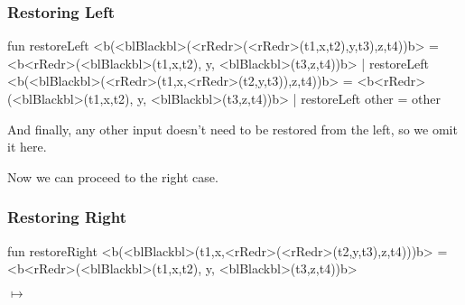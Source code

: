 \documentclass[aspectratio=169]{beamer}
\begin{document}
\begin{frame}[fragile]
  \frametitle{Restoring Left}

  \begin{codeblock}
    fun restoreLeft <b(<blBlackbl>(<rRedr>(<rRedr>(t1,x,t2),y,t3),z,t4))b> =
          <b<rRedr>(<blBlackbl>(t1,x,t2), y, <blBlackbl>(t3,z,t4))b>
      | restoreLeft <b(<blBlackbl>(<rRedr>(t1,x,<rRedr>(t2,y,t3)),z,t4))b> =
          <b<rRedr>(<blBlackbl>(t1,x,t2), y, <blBlackbl>(t3,z,t4))b>
      | restoreLeft other = other
  \end{codeblock}

  \pause
  \vspace{\fill}

  And finally, any other input doesn't need to be restored from the left,
  so we omit it here.

  \vspace{\fill}

  Now we can proceed to the right case.
\end{frame}

\begin{frame}[fragile]
  \frametitle{Restoring Right}

  \begin{codeblock}
    fun restoreRight <b(<blBlackbl>(t1,x,<rRedr>(<rRedr>(t2,y,t3),z,t4)))b> =
          <b<rRedr>(<blBlackbl>(t1,x,t2), y, <blBlackbl>(t3,z,t4))b>
  \end{codeblock}

  \pause
  \begin{center}
    \begin{minipage}{0.35\textwidth}
      \centering
    \end{minipage}
    \pause
    \begin{minipage}{0.1\textwidth}
      \centering
      \large$\longmapsto$
    \end{minipage}
    \begin{minipage}{0.35\textwidth}
      \centering
    \end{minipage}
  \end{center}
\end{frame}
\end{document}
